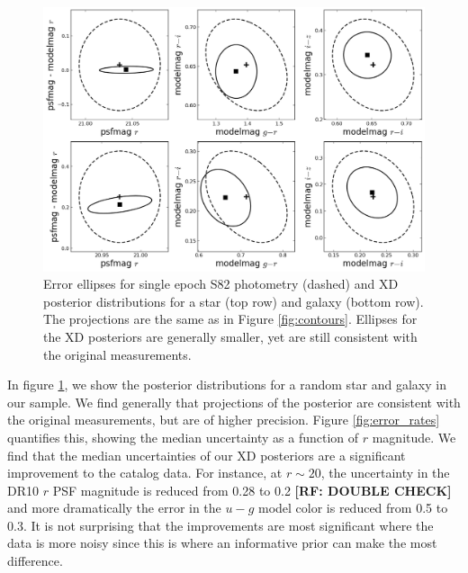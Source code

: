 \documentclass[12pt,preprint]{aastex}
\newcommand\rf[1]{{\bf [RF: #1]}}
\begin{document}
\begin{figure}
\centering
\includegraphics[width=16cm]{fig2.png}
\caption{Error ellipses for single epoch S82 photometry (dashed) and XD
posterior distributions for a star (top row) and galaxy (bottom row).  The 
projections are the same as in Figure \ref{fig:contours}.  Ellipses for the XD
posteriors are generally smaller, yet are still consistent with the original 
measurements.
}
\label{fig:posteriors}
\end{figure}

In figure \ref{fig:posteriors}, we show the posterior distributions for a
random star and galaxy in our sample.  We find generally that projections of 
the posterior are consistent with the original measurements, but are of higher 
precision.  Figure \ref{fig:error_rates} quantifies this, showing the median 
uncertainty as a function of $r$ magnitude.  We find that the median
uncertainties of our XD posteriors are a significant improvement to the
catalog data.  For instance, at $r\sim20$, the uncertainty in the DR10 $r$ PSF 
magnitude is reduced from 0.28 to 0.2 \rf{DOUBLE CHECK} and more dramatically
the error in the $u-g$ model color is reduced from 0.5 to 0.3.  It is not
surprising that the improvements are most significant where the data is more 
noisy since this is where an informative prior can make the most difference.
\end{document}
